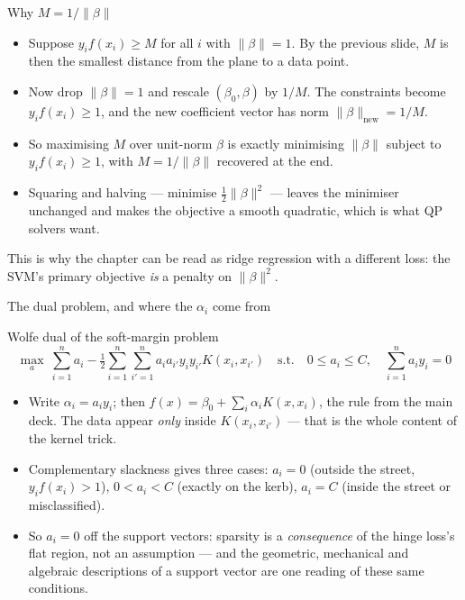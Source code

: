 \documentclass[aspectratio=169,11pt]{beamer}
\begin{document}
\begin{frame}{Why $M = 1/\|\beta\|$}
  \footnotesize
  \begin{readme}
    \begin{itemize}
      \item Suppose $y_i f(x_i)\ge M$ for all $i$ with $\|\beta\|=1$. By the
            previous slide, $M$ is then the smallest distance from the plane to
            a data point.
      \item Now drop $\|\beta\|=1$ and rescale $(\beta_0,\beta)$ by $1/M$. The
            constraints become $y_i f(x_i)\ge 1$, and the new coefficient
            vector has norm $\|\beta\|_{\text{new}} = 1/M$.
      \item So maximising $M$ over unit-norm $\beta$ is exactly minimising
            $\|\beta\|$ subject to $y_i f(x_i)\ge1$, with $M = 1/\|\beta\|$
            recovered at the end.
      \item Squaring and halving --- minimise $\tfrac12\|\beta\|^2$ --- leaves
            the minimiser unchanged and makes the objective a smooth quadratic,
            which is what QP solvers want.
    \end{itemize}
  \end{readme}
  \begin{takeaway}
    This is why the chapter can be read as ridge regression with a different
    loss: the SVM's primary objective \emph{is} a penalty on $\|\beta\|^2$.
  \end{takeaway}
\end{frame}

\begin{frame}{The dual problem, and where the $\alpha_i$ come from}
  \footnotesize
  \begin{block}{Wolfe dual of the soft-margin problem}
    \[
      \max_{a}\ \sum_{i=1}^n a_i - \tfrac12\sum_{i=1}^n\sum_{i'=1}^n
        a_i a_{i'} y_i y_{i'} K(x_i,x_{i'})
      \quad\text{s.t.}\quad
      0 \le a_i \le C,\quad \sum_{i=1}^n a_i y_i = 0
    \]
  \end{block}
  \begin{readme}
    \begin{itemize}
      \item Write $\alpha_i = a_i y_i$; then
            $f(x)=\beta_0+\sum_i \alpha_i K(x,x_i)$, the rule from the main
            deck. The data appear \emph{only} inside $K(x_i,x_{i'})$ --- that is
            the whole content of the kernel trick.
      \item Complementary slackness gives three cases: $a_i=0$ (outside the
            street, $y_if(x_i)>1$), $0<a_i<C$ (exactly on the kerb), $a_i=C$
            (inside the street or misclassified).
      \item So $a_i=0$ off the support vectors: sparsity is a
            \emph{consequence} of the hinge loss's flat region, not an
            assumption --- and the geometric, mechanical and algebraic
            descriptions of a support vector are one reading of these same
            conditions.
    \end{itemize}
  \end{readme}
\end{frame}
\end{document}
